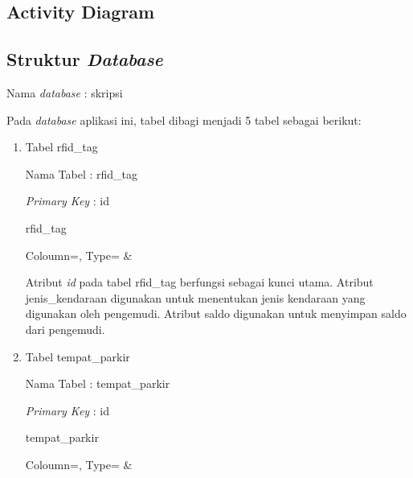 \subsection{Activity Diagram}

\subsection{Struktur \textit{Database}}
Nama \textit{database} : skripsi

Pada \textit{database} aplikasi ini, tabel dibagi menjadi 5 tabel sebagai berikut:

\begin{enumerate}[topsep=0pt,itemsep=0pt,partopsep=0pt, parsep=0pt]
    \item Tabel rfid\_tag

    Nama Tabel : rfid\_tag

    \textit{Primary Key} : id

    \begin{atable}
        \caption{rfid\_tag}
        \label{table:db_rfid_tag}
            {
                Coloumn=\Coloumn, 
                Type=\Type}
            {
                \Coloumn & 
                \Type}
    \end{atable}

    Atribut \textit{id} pada tabel rfid\_tag berfungsi sebagai kunci utama. Atribut jenis\_kendaraan digunakan untuk menentukan jenis kendaraan yang digunakan oleh pengemudi. Atribut saldo digunakan untuk menyimpan saldo dari pengemudi.

    \item Tabel tempat\_parkir

    Nama Tabel : tempat\_parkir

    \textit{Primary Key} : id

    \begin{table} [H]
        \centering
        \caption{tempat\_parkir}
        \label{table:db_tempat_parkir}
            {
                Coloumn=\Coloumn, 
                Type=\Type}
            {
                \Coloumn & 
                \Type}
    \end{table}


\end{enumerate}
